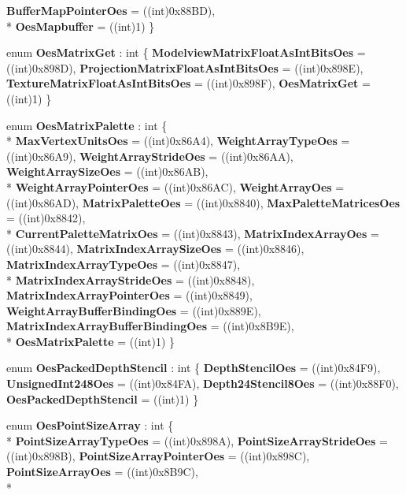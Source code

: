 \begin{DoxyCompactItemize}
{\bfseries Buffer\-Map\-Pointer\-Oes} = ((int)0x88\-B\-D), 
\\*
{\bfseries Oes\-Mapbuffer} = ((int)1)
 \}
\item 
enum {\bfseries Oes\-Matrix\-Get} \-: int \{ {\bfseries Modelview\-Matrix\-Float\-As\-Int\-Bits\-Oes} = ((int)0x898\-D), 
{\bfseries Projection\-Matrix\-Float\-As\-Int\-Bits\-Oes} = ((int)0x898\-E), 
{\bfseries Texture\-Matrix\-Float\-As\-Int\-Bits\-Oes} = ((int)0x898\-F), 
{\bfseries Oes\-Matrix\-Get} = ((int)1)
 \}
\item 
enum {\bfseries Oes\-Matrix\-Palette} \-: int \{ \\*
{\bfseries Max\-Vertex\-Units\-Oes} = ((int)0x86\-A4), 
{\bfseries Weight\-Array\-Type\-Oes} = ((int)0x86\-A9), 
{\bfseries Weight\-Array\-Stride\-Oes} = ((int)0x86\-A\-A), 
{\bfseries Weight\-Array\-Size\-Oes} = ((int)0x86\-A\-B), 
\\*
{\bfseries Weight\-Array\-Pointer\-Oes} = ((int)0x86\-A\-C), 
{\bfseries Weight\-Array\-Oes} = ((int)0x86\-A\-D), 
{\bfseries Matrix\-Palette\-Oes} = ((int)0x8840), 
{\bfseries Max\-Palette\-Matrices\-Oes} = ((int)0x8842), 
\\*
{\bfseries Current\-Palette\-Matrix\-Oes} = ((int)0x8843), 
{\bfseries Matrix\-Index\-Array\-Oes} = ((int)0x8844), 
{\bfseries Matrix\-Index\-Array\-Size\-Oes} = ((int)0x8846), 
{\bfseries Matrix\-Index\-Array\-Type\-Oes} = ((int)0x8847), 
\\*
{\bfseries Matrix\-Index\-Array\-Stride\-Oes} = ((int)0x8848), 
{\bfseries Matrix\-Index\-Array\-Pointer\-Oes} = ((int)0x8849), 
{\bfseries Weight\-Array\-Buffer\-Binding\-Oes} = ((int)0x889\-E), 
{\bfseries Matrix\-Index\-Array\-Buffer\-Binding\-Oes} = ((int)0x8\-B9\-E), 
\\*
{\bfseries Oes\-Matrix\-Palette} = ((int)1)
 \}
\item 
enum {\bfseries Oes\-Packed\-Depth\-Stencil} \-: int \{ {\bfseries Depth\-Stencil\-Oes} = ((int)0x84\-F9), 
{\bfseries Unsigned\-Int248\-Oes} = ((int)0x84\-F\-A), 
{\bfseries Depth24\-Stencil8\-Oes} = ((int)0x88\-F0), 
{\bfseries Oes\-Packed\-Depth\-Stencil} = ((int)1)
 \}
\item 
enum {\bfseries Oes\-Point\-Size\-Array} \-: int \{ \\*
{\bfseries Point\-Size\-Array\-Type\-Oes} = ((int)0x898\-A), 
{\bfseries Point\-Size\-Array\-Stride\-Oes} = ((int)0x898\-B), 
{\bfseries Point\-Size\-Array\-Pointer\-Oes} = ((int)0x898\-C), 
{\bfseries Point\-Size\-Array\-Oes} = ((int)0x8\-B9\-C), 
\\*

\end{DoxyCompactItemize}
